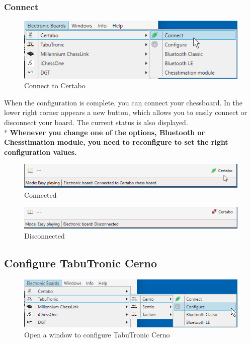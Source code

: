 \documentclass[11pt,a4paper]{article}
\begin{document}
\subsubsection{Connect}
\begin{figure}[H]
	\centering
	\includegraphics[scale=1.0]{Certabo3.png}
	\caption{Connect to Certabo}
	\label{fig:Certabo3}
\end{figure}


When the configuration is complete, you can connect your chessboard.
In the lower right corner appears a new button, which allows you to easily connect or disconnect your board. The current status is also displayed.\\
{\color{red}*}\textbf{ Whenever you change one of the options, Bluetooth or Chesstimation module, you need to reconfigure to set the right configuration values.}

\begin{figure}[H]
	\centering
	\includegraphics[scale=0.8]{Certabo4.png}
	\caption{Connected}
	\label{fig:Certabo4}
\end{figure}

\begin{figure}[H]
	\centering
	\includegraphics[scale=0.8]{Certabo5.png}
	\caption{Disconnected}
	\label{fig:Certabo5}
\end{figure}


\subsection{Configure TabuTronic Cerno} \label{ConfigureTabuTronicCerno}

\begin{figure}[H]
	\centering
	\includegraphics[scale=0.8]{Cerno1.png}
	\caption{Open a window to configure TabuTronic Cerno}
	\label{fig:Cerno1}
\end{figure}
\end{document}
